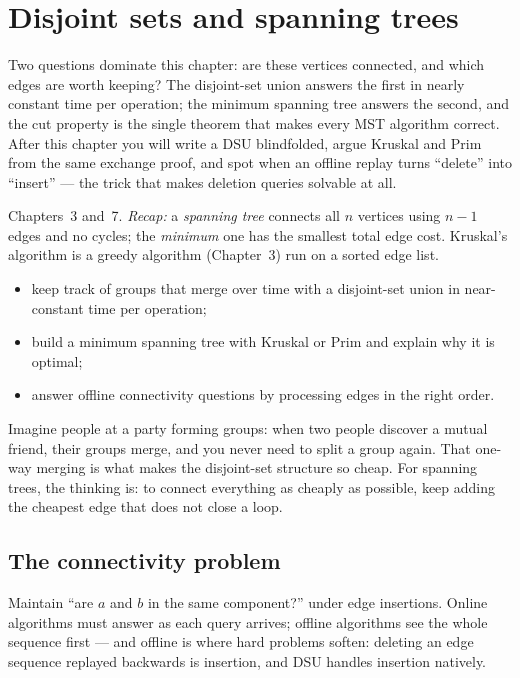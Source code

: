 \chapter{Disjoint sets and spanning trees}\label{ch:dsu}

Two questions dominate this chapter: are these vertices connected,
and which edges are worth keeping? The disjoint-set union answers the
first in nearly constant time per operation; the minimum spanning
tree answers the second, and the cut property is the single theorem
that makes every MST algorithm correct. After this chapter you will
write a DSU blindfolded, argue Kruskal and Prim from the same
exchange proof, and spot when an offline replay turns ``delete''
into ``insert'' --- the trick that makes deletion queries solvable at
all.

\begin{rulebox}
Chapters~3 and~7. \emph{Recap:} a \emph{spanning tree} connects all $n$ vertices using $n-1$ edges and no cycles; the \emph{minimum} one has the smallest total edge cost. Kruskal's algorithm is a greedy algorithm (Chapter~3) run on a sorted edge list.
\end{rulebox}
\begin{wins}
\begin{itemize}
\item keep track of groups that merge over time with a disjoint-set union in near-constant time per operation;
\item build a minimum spanning tree with Kruskal or Prim and explain why it is optimal;
\item answer offline connectivity questions by processing edges in the right order.
\end{itemize}
\end{wins}
\begin{principle}
Imagine people at a party forming groups: when two people discover a mutual friend, their groups merge, and you never need to split a group again. That one-way merging is what makes the disjoint-set structure so cheap. For spanning trees, the thinking is: to connect everything as cheaply as possible, keep adding the cheapest edge that does not close a loop.
\end{principle}

\section{The connectivity problem}\label{sec:conn}
Maintain ``are $a$ and $b$ in the same component?'' under edge
insertions. Online algorithms must answer as each query arrives;
offline algorithms see the whole sequence first --- and offline is
where hard problems soften: deleting an edge sequence replayed
backwards is insertion, and DSU handles insertion natively.


